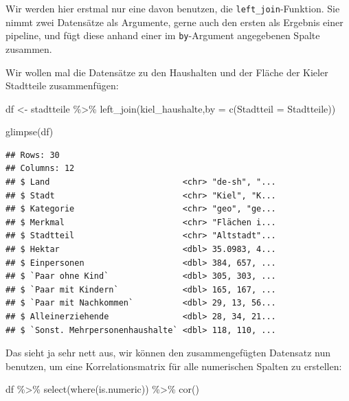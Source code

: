 \documentclass[
]{book}
\newenvironment{Shaded}{\begin{snugshade}}{\end{snugshade}}
\newcommand{\AttributeTok}[1]{\textcolor[rgb]{0.77,0.63,0.00}{#1}}
\newcommand{\FunctionTok}[1]{\textcolor[rgb]{0.00,0.00,0.00}{#1}}
\newcommand{\NormalTok}[1]{#1}
\newcommand{\OtherTok}[1]{\textcolor[rgb]{0.56,0.35,0.01}{#1}}
\newcommand{\SpecialCharTok}[1]{\textcolor[rgb]{0.00,0.00,0.00}{#1}}
\newcommand{\StringTok}[1]{\textcolor[rgb]{0.31,0.60,0.02}{#1}}
\begin{document}
Wir werden hier erstmal nur eine davon benutzen, die \texttt{left\_join}-Funktion. Sie nimmt zwei Datensätze als Argumente, gerne auch den ersten als Ergebnis einer pipeline, und fügt diese anhand einer im \texttt{by}-Argument angegebenen Spalte zusammen.

Wir wollen mal die Datensätze zu den Haushalten und der Fläche der Kieler Stadtteile zusammenfügen:

\begin{Shaded}
\begin{Highlighting}[]
\NormalTok{df }\OtherTok{\textless{}{-}}\NormalTok{ stadtteile }\SpecialCharTok{\%\textgreater{}\%} 
  \FunctionTok{left\_join}\NormalTok{(kiel\_haushalte,}\AttributeTok{by =} \FunctionTok{c}\NormalTok{(}\StringTok{\textquotesingle{}Stadtteil\textquotesingle{}} \OtherTok{=} \StringTok{\textquotesingle{}Stadtteile\textquotesingle{}}\NormalTok{))}

\FunctionTok{glimpse}\NormalTok{(df)}
\end{Highlighting}
\end{Shaded}

\begin{verbatim}
## Rows: 30
## Columns: 12
## $ Land                           <chr> "de-sh", "...
## $ Stadt                          <chr> "Kiel", "K...
## $ Kategorie                      <chr> "geo", "ge...
## $ Merkmal                        <chr> "Flächen i...
## $ Stadtteil                      <chr> "Altstadt"...
## $ Hektar                         <dbl> 35.0983, 4...
## $ Einpersonen                    <dbl> 384, 657, ...
## $ `Paar ohne Kind`               <dbl> 305, 303, ...
## $ `Paar mit Kindern`             <dbl> 165, 167, ...
## $ `Paar mit Nachkommen`          <dbl> 29, 13, 56...
## $ Alleinerziehende               <dbl> 28, 34, 21...
## $ `Sonst. Mehrpersonenhaushalte` <dbl> 118, 110, ...
\end{verbatim}

Das sieht ja sehr nett aus, wir können den zusammengefügten Datensatz nun benutzen, um eine Korrelationsmatrix für alle numerischen Spalten zu erstellen:

\begin{Shaded}
\begin{Highlighting}[]
\NormalTok{df }\SpecialCharTok{\%\textgreater{}\%} 
  \FunctionTok{select}\NormalTok{(}\FunctionTok{where}\NormalTok{(is.numeric)) }\SpecialCharTok{\%\textgreater{}\%} 
  \FunctionTok{cor}\NormalTok{() }
\end{Highlighting}
\end{Shaded}
\end{document}
